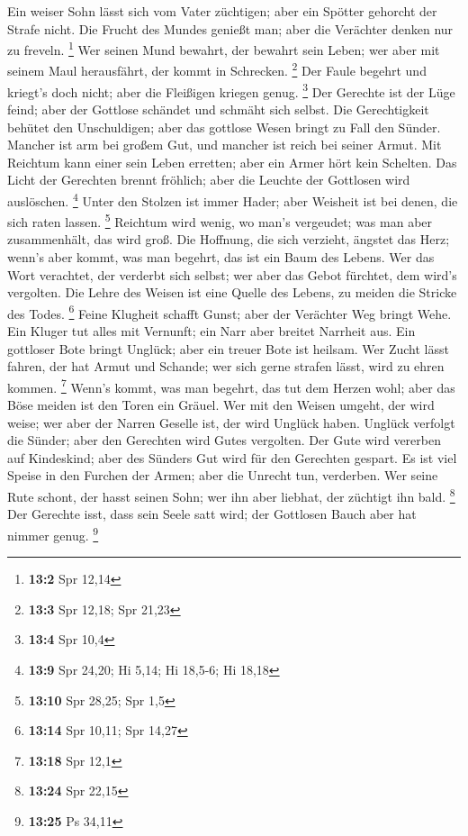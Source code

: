  Ein weiser Sohn lässt sich vom Vater züchtigen; aber ein
Spötter gehorcht der Strafe nicht.  Die Frucht des Mundes
genießt man; aber die Verächter denken nur zu freveln. \footnote{\textbf{13:2}
  Spr 12,14}  Wer seinen Mund bewahrt, der bewahrt sein
Leben; wer aber mit seinem Maul herausfährt, der kommt in Schrecken.
\footnote{\textbf{13:3} Spr 12,18; Spr 21,23}  Der Faule
begehrt und kriegt's doch nicht; aber die Fleißigen kriegen genug.
\footnote{\textbf{13:4} Spr 10,4}  Der Gerechte ist der
Lüge feind; aber der Gottlose schändet und schmäht sich selbst.
 Die Gerechtigkeit behütet den Unschuldigen; aber das
gottlose Wesen bringt zu Fall den Sünder.  Mancher ist arm
bei großem Gut, und mancher ist reich bei seiner Armut. 
Mit Reichtum kann einer sein Leben erretten; aber ein Armer hört kein
Schelten.  Das Licht der Gerechten brennt fröhlich; aber
die Leuchte der Gottlosen wird auslöschen. \footnote{\textbf{13:9} Spr
  24,20; Hi 5,14; Hi 18,5-6; Hi 18,18}  Unter den Stolzen
ist immer Hader; aber Weisheit ist bei denen, die sich raten lassen.
\footnote{\textbf{13:10} Spr 28,25; Spr 1,5}  Reichtum
wird wenig, wo man's vergeudet; was man aber zusammenhält, das wird
groß.  Die Hoffnung, die sich verzieht, ängstet das Herz;
wenn's aber kommt, was man begehrt, das ist ein Baum des Lebens.
 Wer das Wort verachtet, der verderbt sich selbst; wer
aber das Gebot fürchtet, dem wird's vergolten.  Die Lehre
des Weisen ist eine Quelle des Lebens, zu meiden die Stricke des Todes.
\footnote{\textbf{13:14} Spr 10,11; Spr 14,27}  Feine
Klugheit schafft Gunst; aber der Verächter Weg bringt Wehe.
 Ein Kluger tut alles mit Vernunft; ein Narr aber breitet
Narrheit aus.  Ein gottloser Bote bringt Unglück; aber
ein treuer Bote ist heilsam.  Wer Zucht lässt fahren, der
hat Armut und Schande; wer sich gerne strafen lässt, wird zu ehren
kommen. \footnote{\textbf{13:18} Spr 12,1}  Wenn's kommt,
was man begehrt, das tut dem Herzen wohl; aber das Böse meiden ist den
Toren ein Gräuel.  Wer mit den Weisen umgeht, der wird
weise; wer aber der Narren Geselle ist, der wird Unglück haben.
 Unglück verfolgt die Sünder; aber den Gerechten wird
Gutes vergolten.  Der Gute wird vererben auf Kindeskind;
aber des Sünders Gut wird für den Gerechten gespart.  Es
ist viel Speise in den Furchen der Armen; aber die Unrecht tun,
verderben.  Wer seine Rute schont, der hasst seinen Sohn;
wer ihn aber liebhat, der züchtigt ihn bald. \footnote{\textbf{13:24}
  Spr 22,15}  Der Gerechte isst, dass sein Seele satt
wird; der Gottlosen Bauch aber hat nimmer genug. \footnote{\textbf{13:25}
  Ps 34,11}

